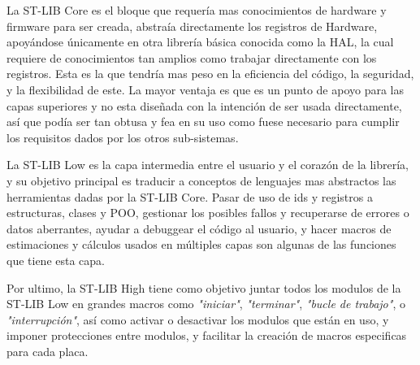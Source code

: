 \documentclass{report}
\begin{document}
La ST-LIB Core es el bloque que requería mas conocimientos de hardware y firmware para ser creada, abstraía directamente los registros de Hardware, apoyándose únicamente en otra librería básica conocida como la HAL, la cual requiere de conocimientos tan amplios como trabajar directamente con los registros. Esta es la que tendría mas peso en la eficiencia del código, la seguridad, y la flexibilidad de este. La mayor ventaja es que es un punto de apoyo para las capas superiores y no esta diseñada con la intención de ser usada directamente, así que podía ser tan obtusa y fea en su uso como fuese necesario para cumplir los requisitos dados por los otros sub-sistemas. \par
La ST-LIB Low es la capa intermedia entre el usuario y el corazón de la librería, y su objetivo principal es traducir a conceptos de lenguajes mas abstractos las herramientas dadas por la ST-LIB Core. Pasar de uso de ids y registros a estructuras, clases y POO, gestionar los posibles fallos y recuperarse de errores o datos aberrantes, ayudar a debuggear el código al usuario, y hacer macros de estimaciones y cálculos usados en múltiples capas son algunas de las funciones que tiene esta capa. \par
Por ultimo, la ST-LIB High tiene como objetivo juntar todos los modulos de la ST-LIB Low en grandes macros como \textit{"iniciar"}, \textit{"terminar"}, \textit{"bucle de trabajo"}, o \textit{"interrupción"}, así como activar o desactivar los modulos que están en uso, y imponer protecciones entre modulos, y facilitar la creación de macros especificas para cada placa. 
\end{document}
